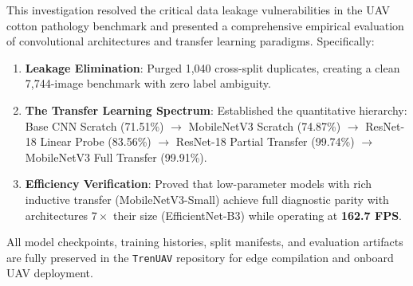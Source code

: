 \documentclass[11pt,a4paper]{article}
\begin{document}
This investigation resolved the critical data leakage vulnerabilities in the UAV cotton pathology benchmark and presented a comprehensive empirical evaluation of convolutional architectures and transfer learning paradigms. Specifically:
\begin{enumerate}
    \item \textbf{Leakage Elimination}: Purged 1,040 cross-split duplicates, creating a clean 7,744-image benchmark with zero label ambiguity.
    \item \textbf{The Transfer Learning Spectrum}: Established the quantitative hierarchy: Base CNN Scratch (71.51\%) $\to$ MobileNetV3 Scratch (74.87\%) $\to$ ResNet-18 Linear Probe (83.56\%) $\to$ ResNet-18 Partial Transfer (99.74\%) $\to$ MobileNetV3 Full Transfer (99.91\%).
    \item \textbf{Efficiency Verification}: Proved that low-parameter models with rich inductive transfer (MobileNetV3-Small) achieve full diagnostic parity with architectures $7\times$ their size (EfficientNet-B3) while operating at \textbf{162.7 FPS}.
\end{enumerate}

All model checkpoints, training histories, split manifests, and evaluation artifacts are fully preserved in the \texttt{TrenUAV} repository for edge compilation and onboard UAV deployment.
\end{document}
